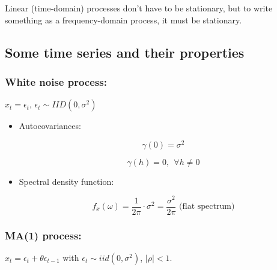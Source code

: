 \documentclass{article}
\begin{document}
Linear (time-domain) processes don't have to be stationary, but to write something as a frequency-domain process, it must be stationary.

\subsection{Some time series and their properties}


\subsubsection{White noise process:}  \(x_t = \epsilon_t\), \(\epsilon_t \sim IID(0, \sigma^2)\)

\begin{itemize}

\item Autocovariances: 

\[
\gamma(0) = \sigma^2
\]

\[
\gamma(h) =0, \ \ \forall h \neq 0
\]

\item Spectral density function:

\[
f_x(\omega) = \frac{1}{2\pi} \cdot \sigma^2 = \frac{\sigma^2}{2 \pi} \text{ (flat spectrum)}
\]

\end{itemize}


\subsubsection{MA(1) process:} \(x_t = \epsilon_t + \theta \epsilon_{t-1}\) with \(\epsilon_t \sim iid(0, \sigma^2)\), \(|\rho| < 1\). 
\end{document}
